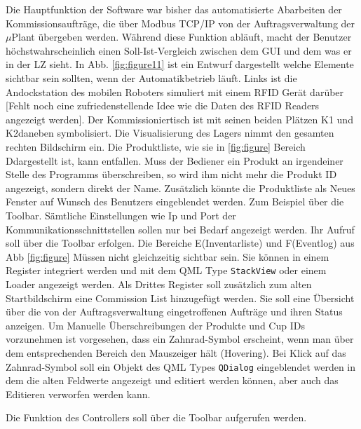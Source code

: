 Die Hauptfunktion der Software war bisher das automatisierte Abarbeiten der Kommissionsaufträge, die über Modbus TCP/IP
von der Auftragsverwaltung der $\mu$Plant übergeben werden.
Während diese Funktion abläuft, macht der Benutzer höchstwahrscheinlich einen Soll-Ist-Vergleich zwischen dem GUI
und dem was er in der LZ sieht.
In Abb. \ref{fig:figure11} ist ein Entwurf dargestellt welche Elemente sichtbar sein sollten, wenn der Automatikbetrieb läuft.
Links ist die Andockstation des mobilen Roboters simuliert mit einem RFID Gerät darüber [Fehlt noch eine zufriedenstellende Idee wie die Daten des RFID Readers angezeigt werden].
Der Kommissioniertisch ist mit seinen beiden Plätzen \glqq K1 \grqq und \glqq K2\grqq  daneben symbolisiert.
Die Visualisierung des Lagers nimmt den gesamten rechten Bildschirm ein.
Die Produktliste, wie sie in \ref{fig:figure} Bereich \glqq D\grqq dargestellt ist, kann entfallen.
Muss der Bediener ein Produkt an irgendeiner Stelle des Programms überschreiben, so wird ihm nicht mehr die Produkt ID
angezeigt, sondern direkt der Name.
Zusätzlich könnte die Produktliste als Neues Fenster auf Wunsch des Benutzers eingeblendet werden.
Zum Beispiel über die Toolbar.
Sämtliche Einstellungen wie Ip und Port der Kommunikationsschnittstellen sollen nur bei Bedarf angezeigt werden.
Ihr Aufruf soll über die Toolbar erfolgen.
Die Bereiche \glqq E\grqq (Inventarliste) und \glqq F\grqq (Eventlog) aus Abb \ref{fig:figure} Müssen nicht
gleichzeitig sichtbar sein.
Sie können in einem Register integriert werden und mit dem QML Type \verb|StackView| oder einem Loader angezeigt werden.
Als Drittes Register soll zusätzlich zum alten Startbildschirm eine Commission List hinzugefügt werden.
Sie soll eine Übersicht über die von der Auftragsverwaltung eingetroffenen Aufträge und ihren Status anzeigen.
Um Manuelle Überschreibungen der Produkte und Cup IDs vorzunehmen ist vorgesehen, dass ein Zahnrad-Symbol erscheint,
wenn man über dem entsprechenden Bereich den Mauszeiger hält (Hovering).
Bei Klick auf das Zahnrad-Symbol soll ein Objekt des QML Types \verb|QDialog| eingeblendet werden in dem die alten
Feldwerte angezeigt und editiert werden können, aber auch das Editieren verworfen werden kann.\\
\vspace{1cm}

Die Funktion des Controllers soll über die Toolbar aufgerufen werden.

